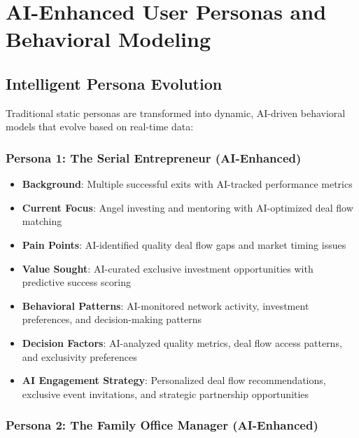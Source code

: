 \section{AI-Enhanced User Personas and Behavioral Modeling}

\subsection{Intelligent Persona Evolution}

Traditional static personas are transformed into dynamic, AI-driven behavioral models that evolve based on real-time data:

\subsubsection{Persona 1: The Serial Entrepreneur (AI-Enhanced)}

\begin{itemize}
    \item \textbf{Background}: Multiple successful exits with AI-tracked performance metrics
    \item \textbf{Current Focus}: Angel investing and mentoring with AI-optimized deal flow matching
    \item \textbf{Pain Points}: AI-identified quality deal flow gaps and market timing issues
    \item \textbf{Value Sought}: AI-curated exclusive investment opportunities with predictive success scoring
    \item \textbf{Behavioral Patterns}: AI-monitored network activity, investment preferences, and decision-making patterns
    \item \textbf{Decision Factors}: AI-analyzed quality metrics, deal flow access patterns, and exclusivity preferences
    \item \textbf{AI Engagement Strategy}: Personalized deal flow recommendations, exclusive event invitations, and strategic partnership opportunities
\end{itemize}

\subsubsection{Persona 2: The Family Office Manager (AI-Enhanced)}

